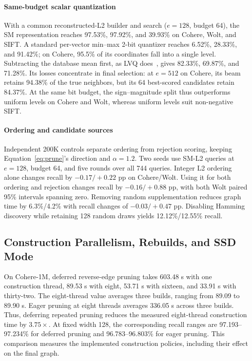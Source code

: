 \paragraph{Same-budget scalar quantization}
With a common reconstructed-L2 builder and search ($e=128$, budget 64), the SM representation reaches 97.53\%, 97.92\%, and 39.93\% on Cohere, Wolt, and SIFT. A standard per-vector min--max 2-bit quantizer reaches 6.52\%, 28.33\%, and 91.42\%; on Cohere, 95.5\% of its coordinates fall into a single level. Subtracting the database mean first, as LVQ does~\cite{aguerrebere2023lvq}, gives 82.33\%, 69.87\%, and 71.28\%. Its losses concentrate in final selection: at $e=512$ on Cohere, its beam retains 94.38\% of the true neighbors, but its 64 best-scored candidates retain 84.37\%. At the same bit budget, the sign--magnitude split thus outperforms uniform levels on Cohere and Wolt, whereas uniform levels suit non-negative SIFT.

\paragraph{Ordering and candidate sources}
Independent 200K controls separate ordering from rejection scoring, keeping Equation~\eqref{eq:prune}'s direction and $\alpha=1.2$. Two seeds use SM-L2 queries at $e=128$, budget 64, and five rounds over all 744 queries. Integer L2 ordering alone changes recall by $-0.17/+0.22$ pp on Cohere/Wolt. Using it for both ordering and rejection changes recall by $-0.16/+0.88$ pp, with both Wolt paired 95\% intervals spanning zero. Removing random supplementation reduces graph time by 6.3\%/4.2\% with recall changes of $-0.03/+0.47$ pp. Disabling Hamming discovery while retaining 128 random draws yields 12.12\%/12.55\% recall.

\subsection{Construction Parallelism, Rebuilds, and SSD Mode}
\label{sec:system}
On Cohere-1M, deferred reverse-edge pruning takes 603.48 s with one construction thread, 89.53 s with eight, 53.71 s with sixteen, and 33.91 s with thirty-two. The eight-thread value averages three builds, ranging from 89.09 to 89.90 s. Eager pruning at eight threads averages 336.05 s across three builds. Thus, deferring repeated pruning reduces the measured eight-thread construction time by $3.75\times$. At fixed width 128, the corresponding recall ranges are 97.193--97.234\% for deferred pruning and 96.783--96.803\% for eager pruning. This comparison measures the implemented construction policies, including their effect on the final graph.

